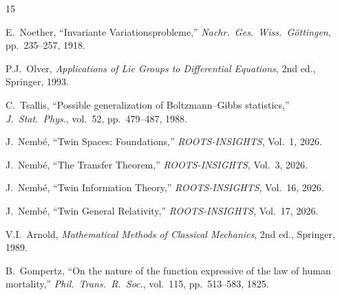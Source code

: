 \documentclass[11pt,twocolumn]{article}
\theoremstyle{plain}
\theoremstyle{definition}
\theoremstyle{remark}
\begin{document}
\begin{thebibliography}{15}

 E.~Noether, ``Invariante Variationsprobleme,'' \emph{Nachr.\ Ges.\ Wiss.\ G\"ottingen}, pp.~235--257, 1918.

 P.J.~Olver, \emph{Applications of Lie Groups to Differential Equations}, 2nd ed., Springer, 1993.

 C.~Tsallis, ``Possible generalization of Boltzmann--Gibbs statistics,'' \emph{J.\ Stat.\ Phys.}, vol.~52, pp.~479--487, 1988.

 J.~Nemb\'e, ``Twin Spaces: Foundations,'' \emph{ROOTS-INSIGHTS}, Vol.~1, 2026.

 J.~Nemb\'e, ``The Transfer Theorem,'' \emph{ROOTS-INSIGHTS}, Vol.~3, 2026.

 J.~Nemb\'e, ``Twin Information Theory,'' \emph{ROOTS-INSIGHTS}, Vol.~16, 2026.

 J.~Nemb\'e, ``Twin General Relativity,'' \emph{ROOTS-INSIGHTS}, Vol.~17, 2026.

 V.I.~Arnold, \emph{Mathematical Methods of Classical Mechanics}, 2nd ed., Springer, 1989.

 B.~Gompertz, ``On the nature of the function expressive of the law of human mortality,'' \emph{Phil.\ Trans.\ R.\ Soc.}, vol.~115, pp.~513--583, 1825.

\end{thebibliography}
\end{document}
